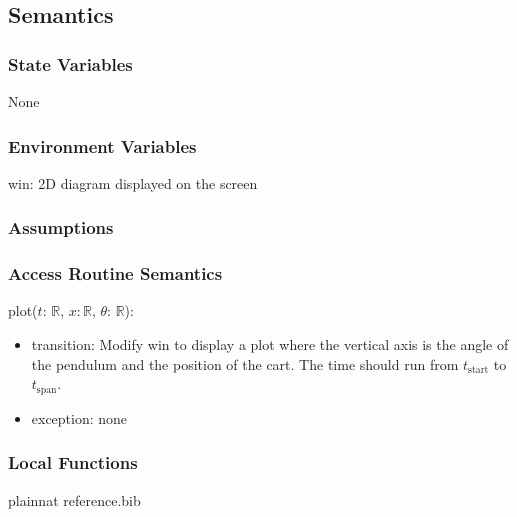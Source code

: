 \documentclass[12pt, titlepage]{article}
\begin{document}
\subsection{Semantics}

\subsubsection{State Variables}
None
\subsubsection{Environment Variables}
win: 2D diagram displayed on the screen
\subsubsection{Assumptions}


\subsubsection{Access Routine Semantics}

\noindent  plot($t$: $\mathbb{R}$, $x$$: \mathbb{R}$, $\theta$: $\mathbb{R}$):
\begin{itemize}
\item transition: Modify win to display a plot where the vertical axis
  is the angle of the pendulum and the position of the cart.  The time should run from $t_\text{start}$ to $t_\text{span}$.
\item exception: none
\end{itemize}


\subsubsection{Local Functions}
\newpage



 {plainnat}
 {reference.bib}

\newpage
\end{document}
